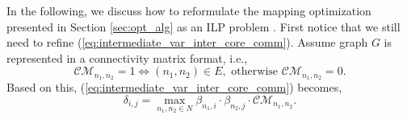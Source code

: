 In the following, we discuss how to reformulate the mapping optimization presented in Section \ref{sec:opt_alg} as an ILP problem \cite{Cormen:2001:IA:580470}. First notice that we still need to refine (\ref{eq:intermediate_var_inter_core_comm}). Assume graph $G$ is represented in a connectivity matrix format, i.e.,
%
\[
\mathcal{CM}_{n_1,n_2} = 1 \Leftrightarrow (n_1,n_2) \in E, \text{ otherwise } \mathcal{CM}_{n_1,n_2} = 0.
\]
%
Based on this, (\ref{eq:intermediate_var_inter_core_comm}) becomes, 
%
\begin{equation} \label{eq:intermediate_var_inter_core_comm_refined}
\delta_{i,j} = \max_{n_1,n_2 \in N}\beta_{n_1,i} \cdot \beta_{n_2,j} \cdot \mathcal{CM}_{n_1,n_2}. %
\end{equation}
%

